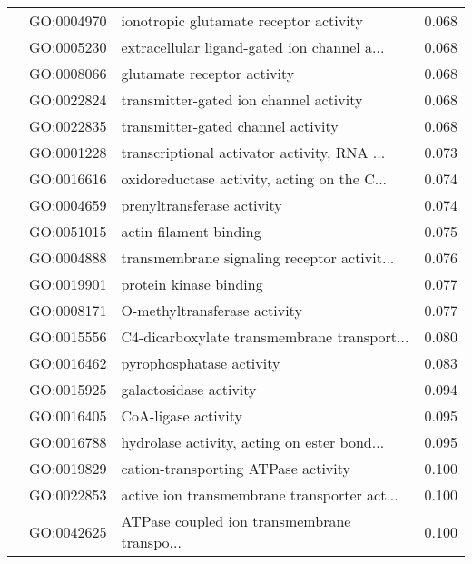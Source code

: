 \begin{longtable}{lllr}
   & GO:0004970 &       ionotropic glutamate receptor activity &         0.068 \\
   & GO:0005230 &  extracellular ligand-gated ion channel a... &         0.068 \\
   & GO:0008066 &                  glutamate receptor activity &         0.068 \\
   & GO:0022824 &       transmitter-gated ion channel activity &         0.068 \\
   & GO:0022835 &           transmitter-gated channel activity &         0.068 \\
   & GO:0001228 &  transcriptional activator activity, RNA ... &         0.073 \\
   & GO:0016616 &  oxidoreductase activity, acting on the C... &         0.074 \\
   & GO:0004659 &                   prenyltransferase activity &         0.074 \\
   & GO:0051015 &                       actin filament binding &         0.075 \\
   & GO:0004888 &  transmembrane signaling receptor activit... &         0.076 \\
   & GO:0019901 &                       protein kinase binding &         0.077 \\
   & GO:0008171 &                 O-methyltransferase activity &         0.077 \\
   & GO:0015556 &  C4-dicarboxylate transmembrane transport... &         0.080 \\
   & GO:0016462 &                     pyrophosphatase activity &         0.083 \\
   & GO:0015925 &                       galactosidase activity &         0.094 \\
   & GO:0016405 &                          CoA-ligase activity &         0.095 \\
   & GO:0016788 &  hydrolase activity, acting on ester bond... &         0.095 \\
   & GO:0019829 &          cation-transporting ATPase activity &         0.100 \\
   & GO:0022853 &  active ion transmembrane transporter act... &         0.100 \\
   & GO:0042625 &  ATPase coupled ion transmembrane transpo... &         0.100 \\
\end{longtable}
